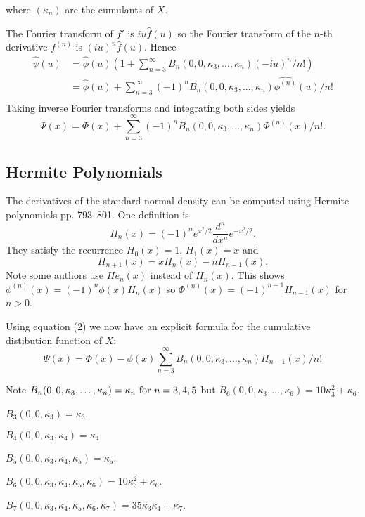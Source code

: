 \documentclass[fleqn]{amsart}
\theoremstyle{definition}
\begin{document}
where \((\kappa_n)\) are the cumulants of \(X\).

The Fourier transform of \(f'\) is \(iu \hat f(u)\) so
the Fourier transform of the \(n\)-th derivative
\(f^{(n)}\) is \((iu)^n\hat f(u)\). Hence
\begin{align*}
\hat{\psi}(u) &= \hat{\phi}(u)(1 + \sum_{n=3}^\infty B_n(0, 0,\kappa_3,...,\kappa_n) (-iu)^n/n!)\\
	&= \hat{\phi}(u) + \sum_{n=3}^\infty (-1)^n B_n(0, 0, \kappa_3,...,\kappa_n)
	\widehat{\phi^{(n)}}(u)/n!\\
\end{align*}
Taking inverse Fourier transforms and integrating both
sides yields
\begin{equation}
	\Psi(x) = \Phi(x) + \sum_{n=3}^\infty (-1)^n B_n(0,0,\kappa_3,...,\kappa_n) \Phi^{(n)}(x)/n!.
\end{equation}

\subsection{Hermite Polynomials}
The derivatives of the standard normal density 
can be computed using Hermite polynomials\cite{AbrSte1964}
pp. 793--801.
One definition is
\[
H_n(x) = (-1)^n e^{x^2/2}\frac{d^n}{dx^n}e^{-x^2/2}.
\]
They satisfy the recurrence \(H_0(x) = 1\), \(H_1(x) = x\) and
\[
H_{n+1}(x) = xH_n(x) - n H_{n-1}(x).
\]
Note some authors use \(He_n(x)\) instead of \(H_n(x)\).
This shows \(\phi^{(n)}(x) = (-1)^n\phi(x) H_n(x)\)
so \(\Phi^{(n)}(x) = (-1)^{n-1} H_{n-1}(x)\) for \(n > 0\).

Using equation (2) we now have an explicit formula for the cumulative
distibution function of \(X\):
\begin{equation}
\Psi(x) = \Phi(x) - \phi(x)\sum_{n=3}^\infty
B_n(0,0,\kappa_3,\dots,\kappa_n) H_{n-1}(x)/n!
\end{equation}

Note \(B_n(0,0,\kappa_3,\ldots,\kappa_n) = \kappa_n$ for \(n = 3,4,5\) but
\(B_6(0,0,\kappa_3,\ldots,\kappa_6) = 10\kappa_3^2 + \kappa_6\).

\(B_3(0,0,\kappa_3) = \kappa_3\).

\(B_4(0,0,\kappa_3,\kappa_4) = \kappa_4\)

\(B_5(0,0,\kappa_3,\kappa_4,\kappa_5) = \kappa_5\).

\(B_6(0,0,\kappa_3,\kappa_4,\kappa_5,\kappa_6) = 10\kappa_3^2 + \kappa_6\).

\(B_7(0,0,\kappa_3,\kappa_4,\kappa_5,\kappa_6,\kappa_7) = 35\kappa_3\kappa_4 + \kappa_7\).
\end{document}

